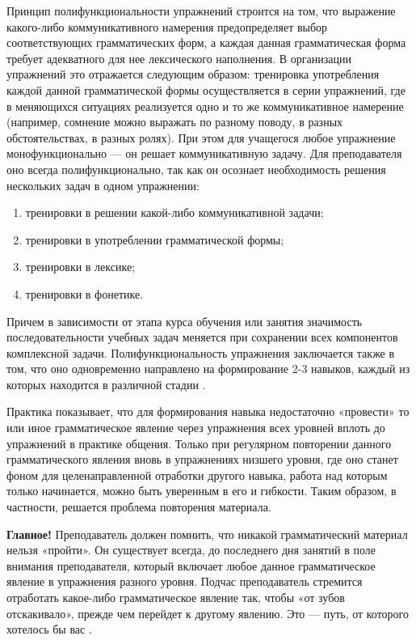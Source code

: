 Принцип полифункциональности упражнений строится на том, что выражение какого-либо коммуникативного намерения предопределяет выбор соответствующих грамматических форм, а каждая данная грамматическая форма требует адекватного для нее лексического наполнения. В организации упражнений это отражается следующим образом: тренировка употребления каждой данной грамматической формы осуществляется в серии упражнений, где в меняющихся ситуациях реализуется одно и то же коммуникативное намерение (например, сомнение можно выражать по разному поводу, в разных обстоятельствах, в разных ролях). При этом для учащегося любое упражнение монофункционально --- он решает коммуникативную задачу. Для преподавателя оно всегда полифункционально, так как он осознает необходимость решения нескольких задач в одном упражнении:
\begin{enumerate}
    \item тренировки в решении какой-либо коммуникативной задачи;
    \item тренировки в употреблении грамматической формы;
    \item тренировки в лексике;
    \item тренировки в фонетике.
\end{enumerate}

Причем в зависимости от этапа курса обучения или занятия значимость последовательности учебных задач меняется при сохранении всех компонентов комплексной задачи. Полифункциональность упражнения заключается также в том, что оно одновременно направлено на формирование 2-3 навыков, каждый из которых находится в различной стадии .

Практика показывает, что для формирования  навыка недостаточно «провести» то или иное грамматическое явление через упражнения всех уровней вплоть до упражнений в практике общения. Только при регулярном повторении данного грамматического явления вновь в упражнениях низшего уровня, где оно станет фоном для целенаправленной отработки другого навыка, работа над которым только начинается, можно быть уверенным в его  и гибкости. Таким образом, в частности, решается проблема повторения материала.

\textbf{Главное!} Преподаватель должен помнить, что никакой грамматический материал нельзя «пройти». Он существует всегда, до последнего дня занятий в поле внимания преподавателя, который включает любое данное грамматическое явление в упражнения разного уровня. Подчас преподаватель стремится отработать какое-либо грамматическое явление так, чтобы «от зубов отскакивало», прежде чем перейдет к другому явлению. Это ---  путь, от которого хотелось бы вас .

